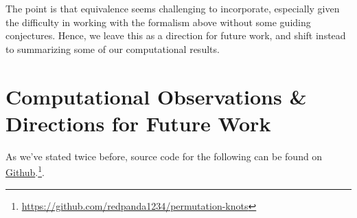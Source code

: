 The point is that equivalence seems challenging to incorporate,
especially given the difficulty in working with the formalism above
without some guiding conjectures. Hence, we leave this as a direction
for future work, and shift instead to summarizing some of our
computational results.





\section{Computational Observations \& Directions for Future
  Work}\label{sec:computational-observations-and-future-work}
As we've stated twice before, source code for the following can be
found on \href{https://github.com/redpanda1234/permutation-knots}{Github}.\footnote{
  \url{https://github.com/redpanda1234/permutation-knots}}.

